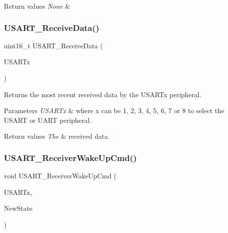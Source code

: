 \begin{DoxyRetVals}{Return values}
{\em None} & \\
\hline
\end{DoxyRetVals}
\mbox{\label{group___u_s_a_r_t_gac67a91845b0b1d54d31bdfb1c5e9867c}} 
\subsubsection{\texorpdfstring{U\+S\+A\+R\+T\+\_\+\+Receive\+Data()}{USART\_ReceiveData()}}
{\footnotesize\ttfamily uint16\+\_\+t U\+S\+A\+R\+T\+\_\+\+Receive\+Data (\begin{DoxyParamCaption}\item[{U\+S\+A\+R\+T\+\_\+\+Type\+Def $\ast$}]{U\+S\+A\+R\+Tx }\end{DoxyParamCaption})}



Returns the most recent received data by the U\+S\+A\+R\+Tx peripheral. 


\begin{DoxyParams}{Parameters}
{\em U\+S\+A\+R\+Tx} & where x can be 1, 2, 3, 4, 5, 6, 7 or 8 to select the U\+S\+A\+RT or U\+A\+RT peripheral. \\
\hline
\end{DoxyParams}

\begin{DoxyRetVals}{Return values}
{\em The} & received data. \\
\hline
\end{DoxyRetVals}
\mbox{\label{group___u_s_a_r_t_gac27b78ce445a16fe33851d2f87781c02}} 
\subsubsection{\texorpdfstring{U\+S\+A\+R\+T\+\_\+\+Receiver\+Wake\+Up\+Cmd()}{USART\_ReceiverWakeUpCmd()}}
{\footnotesize\ttfamily void U\+S\+A\+R\+T\+\_\+\+Receiver\+Wake\+Up\+Cmd (\begin{DoxyParamCaption}\item[{U\+S\+A\+R\+T\+\_\+\+Type\+Def $\ast$}]{U\+S\+A\+R\+Tx,  }\item[{Functional\+State}]{New\+State }\end{DoxyParamCaption})}




